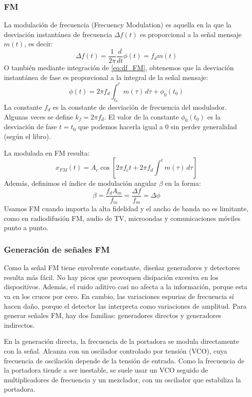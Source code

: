 \documentclass[11pt,a4paper]{article}
\numberwithin{equation}{section}
\begin{document}
\subsubsection{FM}
La modulación de frecuencia (Frecuency Modulation) es aquella en la que la desviación instantánea de frecuencia $\Delta f(t)$ es proporcional a la señal mensaje $m(t)$, es decir:
\begin{equation}\label{eq:df_FM}
  \Delta f(t)=\frac{1}{2\pi}\frac{d}{dt}\phi (t)=f_dm(t)
\end{equation}
O también mediante integración de \eqref{eq:df_FM}, obtenemos que la desviación instantánea de fase es proporcional a la integral de la señal mensaje:
\begin{equation}
  \phi (t)=2\pi f_d\int_{t_0}^{t} m(\tau) \,d\tau + \phi_0(t_0)
\end{equation}
La constante $f_d$ es la constante de desviación de frecuencia del modulador. Algunas veces se define $k_f=2\pi f_d$. El valor de la constante $\phi_0(t_0)$ es la desviación de fase $t=t_0$ que podemos hacerla igual a 0 sin perder generalidad (según el libro).

La modulada en FM resulta:
\begin{equation}
  x_{FM}(t)=A_c\cos[2\pi f_c t + 2\pi f_d\int_{}^{t} m(\tau) \, d\tau]
\end{equation}
Además, definimos el índice de modulación angular $\beta$ en la forma:
\begin{equation}
  \beta = \frac{f_dA_m}{f_m}=\frac{\Delta f}{f_m}=\Delta \phi
\end{equation}
Usamos FM cuando importa la alta fidelidad y el ancho de banda no es limitante, como en radiodifusión FM, audio de TV, microondas y comunicaciones móviles punto a punto.

\subsubsection{Generación de señales FM}
Como la señal FM tiene envolvente constante, diseñar generadores y detectores resulta más fácil. No hay picos que provoquen disipación excesiva en los dispositivos. Además, el ruido aditivo casi no afecta a la información, porque esta va en los cruces por cero. En cambio, las variaciones espurias de frecuencia sí hacen daño, porque el detector las interpreta como variaciones de amplitud. Para generar señales FM, hay dos familias: generadores directos y generadores indirectos.

En la generación directa, la frecuencia de la portadora se modula directamente con la señal. Alcanza con un oscilador controlado por tensión (VCO), cuya frecuencia de oscilación depende de la tensión de entrada. Como la frecuencia de la portadora tiende a ser inestable, se suele usar un VCO seguido de multiplicadores de frecuencia y un mezclador, con un oscilador que estabiliza la portadora.
\end{document}
